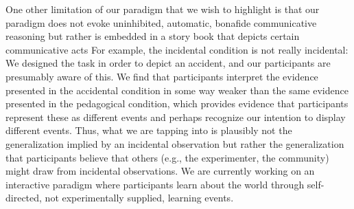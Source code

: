 \documentclass[10pt,letterpaper]{article}
\newcommand{\red}[1]{\textcolor{Red}{#1}}
\begin{document}
One other limitation of our paradigm that we wish to highlight is that our paradigm does not evoke uninhibited, automatic, bonafide communicative reasoning but rather is embedded in a story book that depicts certain communicative acts %
For example, the incidental condition is not really incidental: We designed the task in order to depict an accident, and our participants are presumably aware of this. 
We find that participants interpret the evidence presented in the accidental condition in some way weaker than the same evidence presented in the pedagogical condition, which provides evidence that participants represent these as different events and perhaps recognize our intention to display different events. Thus, what we are tapping into is plausibly not the generalization implied by an incidental observation but rather the generalization that participants believe that others (e.g., the experimenter, the community) might draw from incidental observations. 
We are currently working on an interactive paradigm where participants learn about the world through self-directed, not experimentally supplied, learning events. 






\setlength{\bibleftmargin}{.125in}
\setlength{\bibindent}{-\bibleftmargin}


\end{document}
